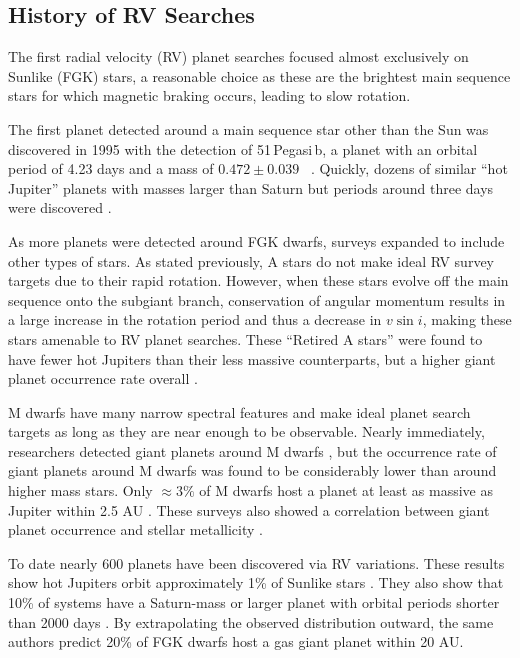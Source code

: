 \subsection{History of RV Searches}
The first radial velocity (RV) planet searches focused almost exclusively on Sunlike
(FGK) stars, a reasonable choice as these are the brightest main sequence stars for 
which magnetic braking occurs, leading to slow rotation.

The first planet detected around a main sequence star other than the Sun was discovered
in 1995 with the detection of 51\,Pegasi\,b, a planet with an orbital period of 4.23 days
and a mass of $0.472 \pm 0.039$ \mjup\ \citep{Mayor95}.
Quickly, dozens of similar ``hot Jupiter'' planets with masses larger than Saturn but 
periods around three days were discovered \citep[e.g.][]{Butler97, Marcy98, Wright07}.

As more planets were detected around FGK dwarfs, surveys expanded to include other
types of stars.
As stated previously, A stars do not make ideal RV survey targets due to their rapid
rotation.
However, when these stars evolve off the main sequence onto the subgiant branch,
conservation of angular momentum results in a large increase in the rotation period and
thus a decrease in $v \sin i$, making these stars amenable to RV planet searches.
These ``Retired A stars'' were found to have fewer hot Jupiters than their less massive
counterparts, but a higher giant planet occurrence rate overall \citep{Johnson07b,
Bowler10, Johnson11b}.

M dwarfs have many narrow spectral features and make ideal planet search targets as
long as they are near enough to be observable.
Nearly immediately, researchers detected giant planets around M dwarfs \citep{Butler04, Butler06}, but the occurrence rate of giant planets around M dwarfs was found to be 
considerably lower than around higher mass stars.
Only $\approx 3\%$ of M dwarfs host a planet at least as massive as Jupiter 
within 2.5 AU \citep{Johnson10a, Bonfils13}.
These surveys also showed a correlation between giant planet occurrence and stellar
metallicity \citep{Fischer05, JohnsonApps09}.



To date nearly 600 planets have been discovered via RV variations.
These results show hot Jupiters orbit approximately 1\% of Sunlike stars \citep{Wright12}.
They also show that 10\% of systems have a Saturn-mass or larger planet with orbital periods
shorter than 2000 days \citep{Cumming08}.
By extrapolating the observed distribution outward, the same authors predict 20\% of FGK dwarfs host a gas giant planet within 20 AU.

